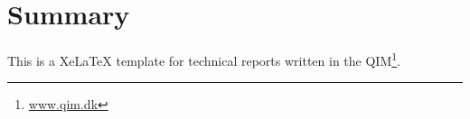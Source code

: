\chapter{Summary}
This is a XeLaTeX template for technical reports written in the \acf{QIM}\footnote{\url{www.qim.dk}}. 


